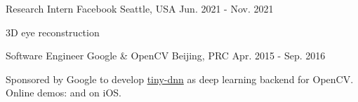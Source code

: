 


\begin{cventries}


\cventry
{Research Intern} %
{Facebook} %
{Seattle, USA} %
{Jun. 2021 - Nov. 2021} %
{ %
\begin{cvitems}
\item {3D eye reconstruction}
\end{cvitems}
}

\cventry
{Software Engineer} %
{Google \& OpenCV} %
{Beijing, PRC} %
{Apr. 2015 - Sep. 2016} %
{ %
\begin{cvitems}
\item {Sponsored by Google to develop \href{https://github.com/tiny-dnn/tiny-dnn}{tiny-dnn} as deep learning backend for OpenCV. Online demos: \href{https://www.youtube.com/watch?v=Mc20rTYdXTE}{} and \href{https://drive.google.com/open?id=0B-RYa1FDOrYXVUEzcG1mdnl5a3M}{} on iOS.
}
\end{cvitems}
}


\end{cventries}
